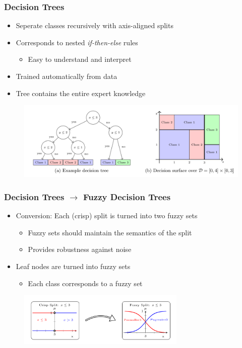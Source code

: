 \documentclass[
	10pt,
	t		%
]{beamer}
\begin{document}
\begin{frame}
	\frametitle{Decision Trees}
	
	\begin{itemize}
		\item Seperate classes recursively with axis-aligned splits
		\item Corresponds to nested \textit{if-then-else} rules
		      \begin{itemize}
			      \item Easy to understand and interpret
		      \end{itemize}
		\item Trained automatically from data
		\item Tree contains the entire expert knowledge
	\end{itemize}
	
	\begin{figure}
		\centering
		\includegraphics[width=1\textwidth]{figures/decision-tree.png}
	\end{figure}
	
\end{frame}

\begin{frame}
	\frametitle{Decision Trees $\rightarrow$ Fuzzy Decision Trees}
	
	\begin{itemize}
		\item Conversion: Each (crisp) split is turned into two fuzzy sets
		      \begin{itemize}
			      \item Fuzzy sets should maintain the semantics of the split
			      \item Provides robustness against noise
		      \end{itemize}
		\item Leaf nodes are turned into fuzzy sets
		      \begin{itemize}
			      \item Each class corresponds to a fuzzy set
		      \end{itemize}
	\end{itemize}
	\begin{figure}
		\centering
		\includegraphics[width=8cm]{figures/leaf-conversion.png}
	\end{figure}
	
\end{frame}
\end{document}
